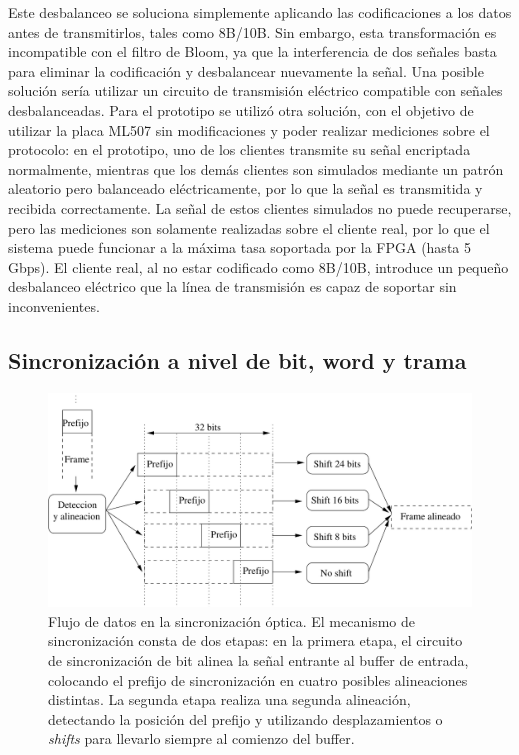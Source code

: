 Este desbalanceo se soluciona simplemente aplicando las codificaciones a los datos antes de transmitirlos, tales como 8B/10B. Sin embargo, esta transformación es incompatible con el filtro de Bloom, ya que la interferencia de dos señales basta para eliminar la codificación y desbalancear nuevamente la señal. Una posible solución sería utilizar un circuito de transmisión eléctrico compatible con señales desbalanceadas. Para el prototipo se utilizó otra solución, con el objetivo de utilizar la placa ML507 sin modificaciones y poder realizar mediciones sobre el protocolo: en el prototipo, uno de los clientes transmite su señal encriptada normalmente, mientras que los demás clientes son simulados mediante un patrón aleatorio pero balanceado eléctricamente, por lo que la señal es transmitida y recibida correctamente. La señal de estos clientes simulados no puede recuperarse, pero las mediciones son solamente realizadas sobre el cliente real, por lo que el sistema puede funcionar a la máxima tasa soportada por la FPGA (hasta 5 Gbps). El cliente real, al no estar codificado como 8B/10B, introduce un pequeño desbalanceo eléctrico que la línea de transmisión es capaz de soportar sin inconvenientes.

\subsection{Sincronización a nivel de bit, word y trama}
\label{fpga:sync}
\begin{figure}[t]
  \centering
    \includegraphics[width=6.2in]{graphs/optsync.pdf}
\caption {Flujo de datos en la sincronización óptica. El mecanismo de sincronización consta de dos etapas: en la primera etapa, el circuito de sincronización de bit alinea la señal entrante al buffer de entrada, colocando el prefijo de sincronización en cuatro posibles alineaciones distintas. La segunda etapa realiza una segunda alineación, detectando la posición del prefijo y utilizando desplazamientos o \textit{shifts} para llevarlo siempre al comienzo del buffer.}
\label{fig:optsync}
\end{figure}


